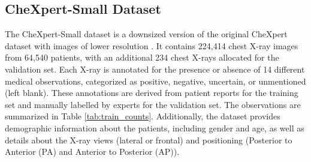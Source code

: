 \documentclass[12pt,DIV14,BCOR12mm,a4paper,footinclude=false,headinclude,parskip=half-,twoside,openright,cleardoublepage=empty,toc=index,bibliography=totoc,listof=totoc]{scrreprt}
\numberwithin{equation}{chapter}
\begin{document}

\subsection{CheXpert-Small Dataset}
The CheXpert-Small dataset is a downsized version of the original CheXpert dataset with images of lower resolution \cite{10.1007/978-3-031-16431-6_62}. It contains 224,414 chest X-ray images from 64,540 patients, with an additional 234 chest X-rays allocated for the validation set. Each X-ray is annotated for the presence or absence of 14 different medical observations, categorized as positive, negative, uncertain, or unmentioned (left blank). These annotations are derived from patient reports for the training set and manually labelled by experts for the validation set. The observations are summarized in Table \ref{tab:train_counts}. Additionally, the dataset provides demographic information about the patients, including gender and age, as well as details about the X-ray views (lateral or frontal) and positioning (Posterior to Anterior (PA) and  Anterior to Posterior (AP)).
\end{document}
